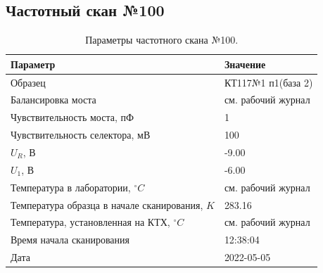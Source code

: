 \subsection{Частотный скан №100}
\begin{table}[!ht]
    \centering
    \caption{Параметры частотного скана №100.}
    \begin{tabular}{|l|l|}
        \hline
        Параметр                                       & Значение                  \\ \hline
        Образец                                        & КТ117№1 п1(база 2)        \\ \hline
        Балансировка моста                             & см. рабочий журнал        \\ \hline
        Чувствительность моста, пФ                     & 1                         \\ \hline
        Чувствительность селектора, мВ                 & 100                       \\ \hline
        $U_R$, В                                       & -9.00                     \\ \hline
        $U_1$, В                                       & -6.00                     \\ \hline
        Температура в лаборатории, $^\circ C$          & см. рабочий журнал        \\ \hline
        Температура образца в начале сканирования, $K$ & 283.16                    \\ \hline
        Температура, установленная на КТХ, $^\circ C$  & см. рабочий журнал        \\ \hline
        Время начала сканирования                      & 12:38:04                  \\ \hline
        Дата                                           & 2022-05-05                \\ \hline
    \end{tabular}
    \label{table:frequency_scan_100}
\end{table}

